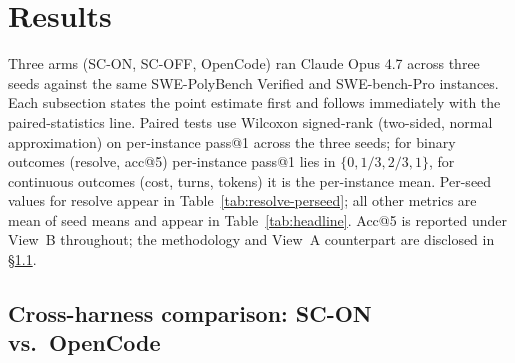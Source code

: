 %
%
%

\section{Results}
\label{sec:results}

Three arms (SC-ON, SC-OFF, OpenCode) ran Claude Opus 4.7 across three seeds against the
same SWE-PolyBench Verified and SWE-bench-Pro instances. Each subsection states the point
estimate first and follows immediately with the paired-statistics line. Paired tests use
Wilcoxon signed-rank (two-sided, normal approximation) on per-instance pass@1 across the
three seeds; for binary outcomes (resolve, acc@5) per-instance pass@1 lies in
$\{0, 1/3, 2/3, 1\}$, for continuous outcomes (cost, turns, tokens) it is the
per-instance mean. Per-seed values for resolve appear in
Table~\ref{tab:resolve-perseed}; all other metrics are mean of seed means and appear in
Table~\ref{tab:headline}. Acc@5 is reported under View~B throughout; the methodology and
View~A counterpart are disclosed in \S\ref{sec:results-crossharness}.

\subsection{Cross-harness comparison: SC-ON vs.\ OpenCode}
\label{sec:results-crossharness}

\begin{table}[!tbp]
  \centering
  \caption{Resolve \% per seed (seeds 0, 1, 2) for each arm, with the across-seed mean and
    standard deviation. Direction is consistent across seeds for SC-ON over both
    comparators.}
  \label{tab:resolve-perseed}
  
\end{table}


